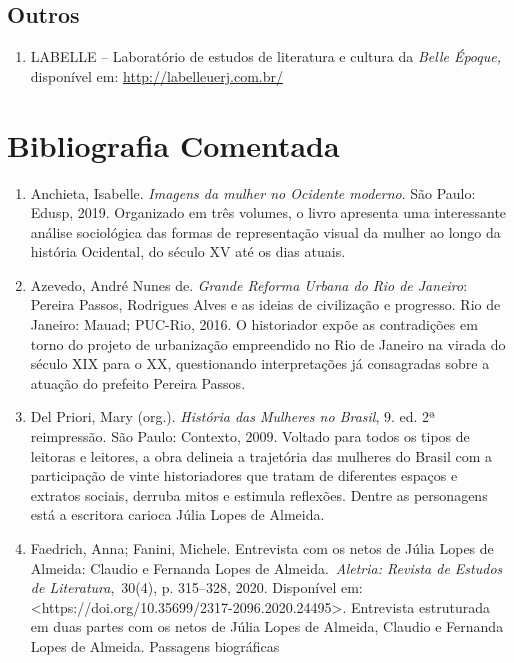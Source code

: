 \documentclass[12pt]{extarticle}
\begin{document}
\subsection{Outros}

\begin{enumerate}
\item
  LABELLE -- Laboratório de estudos de literatura e cultura da \emph{Belle Époque,} disponível em: \url{http://labelleuerj.com.br/}
\end{enumerate}



\section{Bibliografia Comentada}

\begin{enumerate}
\item
  Anchieta, Isabelle. \emph{Imagens da mulher no Ocidente moderno}. São
  Paulo: Edusp, 2019. Organizado em três volumes, o livro apresenta uma
  interessante análise sociológica das formas de representação visual da
  mulher ao longo da história Ocidental, do século XV até os dias
  atuais.
\item
  Azevedo, André Nunes de. \emph{Grande Reforma Urbana do Rio de
  Janeiro}: Pereira Passos, Rodrigues Alves e as ideias de civilização e
  progresso. Rio de Janeiro: Mauad; PUC-Rio, 2016. O historiador expõe
  as contradições em torno do projeto de urbanização empreendido no Rio
  de Janeiro na virada do século XIX para o XX, questionando
  interpretações já consagradas sobre a atuação do prefeito Pereira
  Passos.
\item
  Del Priori, Mary (org.). \emph{História das Mulheres no Brasil}, 9.
  ed. 2ª reimpressão. São Paulo: Contexto, 2009. Voltado para todos os
  tipos de leitoras e leitores, a obra delineia a trajetória das
  mulheres do Brasil com a participação de vinte historiadores que
  tratam de diferentes espaços e extratos sociais, derruba mitos e
  estimula reflexões. Dentre as personagens está a escritora carioca
  Júlia Lopes de Almeida.
\item
  Faedrich, Anna; Fanini, Michele. Entrevista com os netos de Júlia
  Lopes de Almeida: Claudio e Fernanda Lopes de Almeida.~\emph{Aletria:
  Revista de Estudos de Literatura},~30(4), p. 315--328, 2020.
  Disponível em:
  \textless{}https://doi.org/10.35699/2317-2096.2020.24495\textgreater{}.
  Entrevista estruturada em duas partes com os netos de Júlia Lopes de
  Almeida, Claudio e Fernanda Lopes de Almeida. Passagens biográficas

\end{enumerate}
\end{document}
